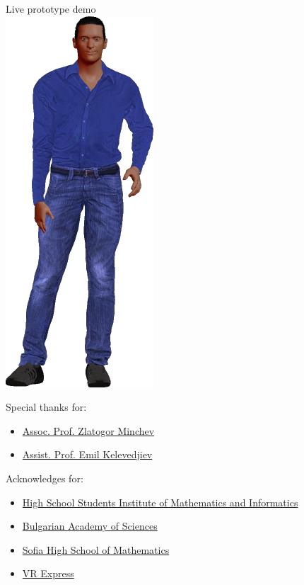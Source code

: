 \documentclass[12pt]{beamer}
\begin{document}
	\begin{frame}
		\begin{center}
			{\Huge Live prototype demo} \\ \vspace{1cm}
			\includegraphics[scale=0.25]{../bad_boy.png}
		\end{center}
	\end{frame}
	\begin{frame}
		Special thanks for:
		\begin{itemize}
			\item \href{https://bg.linkedin.com/in/zlatogor-minchev-a101b85}{Assoc. Prof. Zlatogor Minchev} \\
			\item \href{https://bg.linkedin.com/in/emil-kelevedjiev-34727310b}{Assist. Prof. Emil Kelevedjiev} \\\par
		\end{itemize}
		\vspace{0.5cm}
		Acknowledges for:
		\begin{itemize}
			\item \href{http://www.math.bas.bg/omi/hssimi/}{High School Students Institute of Mathematics and Informatics}
			\item \href{http://www.math.bas.bg/}{Bulgarian Academy of Sciences}
			\item \href{http://www.smg.bg}{Sofia High School of Mathematics}
			\item \href{https://www.vrexpress.bg/}{VR Express}
		\end{itemize}
	\end{frame}
	
\end{document}
